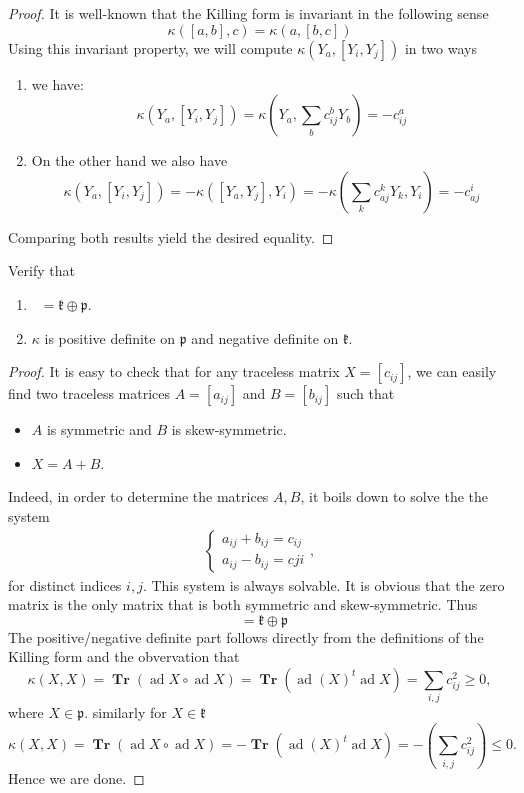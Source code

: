 \documentclass[12pt]{article} %
\DeclareMathOperator{\sln}{\mathfrak{sl}_n(\mathbb{R})}
\DeclareMathOperator{\Tr}{\textbf{Tr}}
\DeclareMathOperator{\ad}{ad}
\begin{document}
\begin{proof}
  \hfill

  It is well-known that the Killing form is invariant in the following sense
  \[\kappa([a,b],c) = \kappa(a,[b,c])\]
  Using this invariant property, we will compute $\kappa(Y_a,[Y_i,Y_j])$ in two ways
  \begin{enumerate}
    \item we have:
          \[\kappa\left(Y_a,[Y_i,Y_j]\right) = \kappa\left(Y_a,\sum_b c^b_{ij}Y_b\right) = -c^a_{ij}\]
    \item On the other hand we also have
          \[\kappa(Y_a,[Y_i,Y_j]) = -\kappa([Y_a,Y_j],Y_i) = -\kappa \left(\sum_k c_{aj}^k Y_k,Y_i\right)=-c^i_{aj}\]
  \end{enumerate}
  Comparing both results yield the desired equality.
\end{proof}
\begin{tcolorbox}[colback=blue!5!white,colframe=blue!75!black,title=Problem 3]
  Verify that
  \begin{enumerate}
    \item $\sln  = \mathfrak{k}\oplus\mathfrak{p}$.
    \item $\kappa$ is positive definite on $\mathfrak{p}$ and negative definite on $\mathfrak{k}$.
  \end{enumerate}
\end{tcolorbox}
\begin{proof}
  It is easy to check that for any traceless matrix $X = [c_{ij}]$, we can easily
  find two traceless matrices $A = [a_{ij}]$ and $B = [b_{ij}]$ such that
  \begin{itemize}
    \item $A$ is symmetric and $B$ is skew-symmetric.
    \item $X= A+B$.
  \end{itemize}
  Indeed, in order to determine the matrices $A,B$, it boils down to solve the the system
  \begin{align*}
    \begin{cases}
      a_{ij}+b_{ij}=c_{ij} \\
      a_{ij}-b_{ij} = c{ji}
    \end{cases},
  \end{align*}
  for distinct indices $i,j$. This system is always solvable. It is obvious that the zero matrix
  is the only matrix that is both symmetric and skew-symmetric. Thus
  \[\sln = \mathfrak{k}\oplus\mathfrak{p}\]
  The positive/negative definite part follows directly from the definitions of
  the Killing form and the obvervation that
  \[\kappa(X,X) = \Tr(\ad X \circ \ad X) = \Tr(\ad (X)^t\ad X) = \sum_{i,j}c^2_{ij} \ge 0,\]
  where $X \in \mathfrak{p}$. similarly for $X \in \mathfrak{k}$
  \[\kappa(X,X) = \Tr(\ad X \circ \ad X) = -\Tr(\ad (X)^t\ad X) = -\left(\sum_{i,j}c^2_{ij}\right) \le 0.\]
  Hence we are done.
\end{proof}
\end{document}
